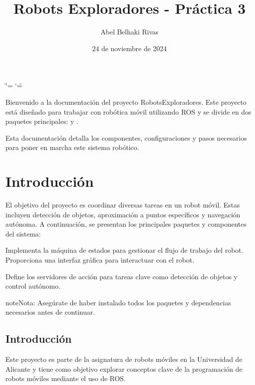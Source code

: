\documentclass[a4paper,10pt,spanish]{sphinxmanual}
\title{Robots Exploradores - Práctica 3}
\date{24 de noviembre de 2024}
\author{Abel Belhaki Rivas}
\begin{document}
\ifdefined\shorthandoff
  \ifnum\catcode`\=\string=\active\shorthandoff{=}\fi
  \ifnum\catcode`\"=\active{}\fi
\fi

\pagestyle{empty}
\sphinxmaketitle
\pagestyle{plain}
\sphinxtableofcontents
\pagestyle{normal}
\label{\detokenize{index::doc}}


\sphinxAtStartPar
Bienvenido a la documentación del proyecto RobotsExploradores. Este proyecto está diseñado para trabajar con robótica móvil utilizando ROS y se divide en dos paquetes principales:  y .

\sphinxAtStartPar
Esta documentación detalla los componentes, configuraciones y pasos necesarios para poner en marcha este sistema robótico.


\chapter{Introducción}
\label{\detokenize{index:introduccion}}
\sphinxAtStartPar
El objetivo del proyecto es coordinar diversas tareas en un robot móvil. Estas incluyen detección de objetos, aproximación a puntos específicos y navegación autónoma. A continuación, se presentan los principales paquetes y componentes del sistema:

\sphinxAtStartPar
{}
\sphinxhyphen{} Implementa la máquina de estados para gestionar el flujo de trabajo del robot.
\sphinxhyphen{} Proporciona una interfaz gráfica para interactuar con el robot.

\sphinxAtStartPar
{}
\sphinxhyphen{} Define los servidores de acción para tareas clave como detección de objetos y control autónomo.

\begin{sphinxadmonition}{note}{Nota:}
\sphinxAtStartPar
Asegúrate de haber instalado todos los paquetes y dependencias necesarios antes de continuar.
\end{sphinxadmonition}

\sphinxstepscope


\section{Introducción}
\label{\detokenize{introduccion:introduccion}}\label{\detokenize{introduccion::doc}}
\sphinxAtStartPar
Este proyecto es parte de la asignatura de robots móviles en la Universidad de Alicante y tiene como objetivo explorar conceptos clave de la programación de robots móviles mediante el uso de ROS.
\end{document}
